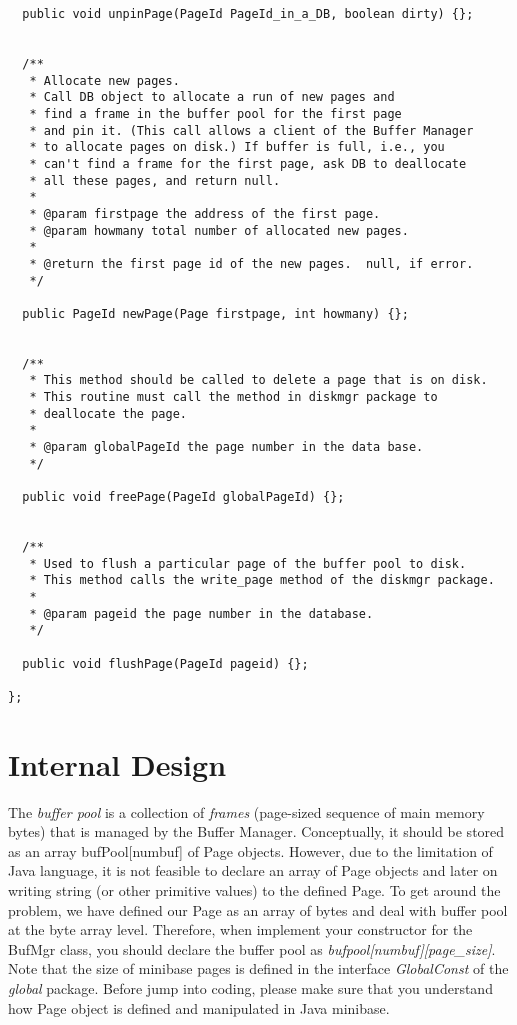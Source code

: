 \begin{verbatim}
  public void unpinPage(PageId PageId_in_a_DB, boolean dirty) {};


  /** 
   * Allocate new pages.
   * Call DB object to allocate a run of new pages and 
   * find a frame in the buffer pool for the first page
   * and pin it. (This call allows a client of the Buffer Manager
   * to allocate pages on disk.) If buffer is full, i.e., you 
   * can't find a frame for the first page, ask DB to deallocate 
   * all these pages, and return null.
   *
   * @param firstpage the address of the first page.
   * @param howmany total number of allocated new pages.
   *
   * @return the first page id of the new pages.  null, if error.
   */

  public PageId newPage(Page firstpage, int howmany) {};

		
  /**
   * This method should be called to delete a page that is on disk.
   * This routine must call the method in diskmgr package to 
   * deallocate the page. 
   *
   * @param globalPageId the page number in the data base.
   */

  public void freePage(PageId globalPageId) {};


  /**
   * Used to flush a particular page of the buffer pool to disk.
   * This method calls the write_page method of the diskmgr package.
   *
   * @param pageid the page number in the database.
   */

  public void flushPage(PageId pageid) {};

};

\end{verbatim}


\section{Internal Design}

The {\em buffer pool} is a collection of {\em frames} (page-sized 
sequence of main memory bytes) that is managed by the Buffer Manager.
Conceptually, it should be stored as an array bufPool[numbuf] of 
Page objects.  However, due to the limitation of Java language, it
is not feasible to declare an array of Page objects and later on 
writing string (or other primitive values) to the defined Page.
To get around the problem, we have defined our Page as an array of 
bytes and deal with buffer pool at the byte array level.  Therefore, 
when implement your constructor for the BufMgr class, you should declare
the buffer pool as {\em bufpool[numbuf][page\_size]}.  Note that the
size of minibase pages is defined in the interface {\em GlobalConst} of
the {\em global} package.  Before jump into coding, please make sure
that you understand how Page object is defined and manipulated in Java
minibase.


